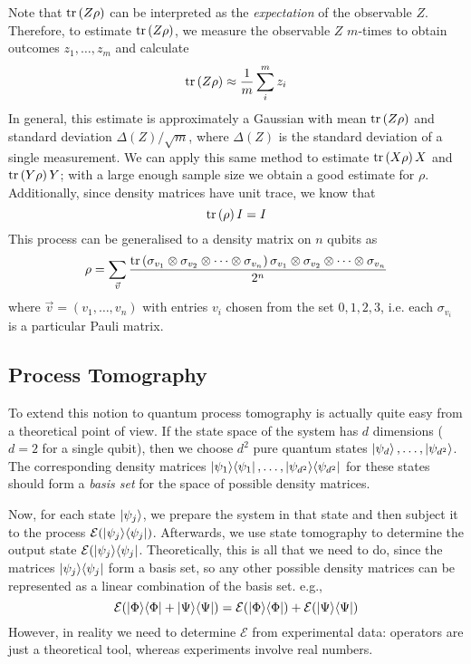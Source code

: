 Note that $\text{tr}\left(Z\rho\right)$ can be interpreted as the \textit{expectation} of the observable $Z$.
Therefore, to estimate $\text{tr}\left(Z\rho\right)$, we measure the observable $Z$ $m$-times to obtain outcomes
$z_1, \dots, z_m$ and calculate
\begin{equation}
    \text{tr}\left(Z\rho\right) \approx \frac{1}{m} \sum_i^m z_i
\end{equation}
In general, this estimate is approximately a Gaussian with mean $\text{tr}\left(Z\rho\right)$ and standard deviation
$\Delta(Z) / \sqrt{m}$, where $\Delta(Z)$ is the standard deviation of a single measurement. We can
apply this same method to estimate $\text{tr}\left(X\rho\right)X$ and $\text{tr}\left(Y\rho\right)Y$; with a large enough sample size
we obtain a good estimate for $\rho$. Additionally, since density matrices have unit trace, we know
that
\begin{equation}
    \text{tr}\left(\rho\right) I = I
\end{equation}
This process can be generalised to a density matrix on $n$ qubits as
\begin{equation}
    \rho = \sum_{\vec{v}} \frac{\text{tr}\left(\sigma_{v_1} \otimes \sigma_{v_2} \otimes \dots \otimes \sigma_{v_n}\right) \sigma_{v_1} \otimes \sigma_{v_2} \otimes \dots \otimes \sigma_{v_n}}{2^n}
\end{equation}
where $\vec{v} = \left(v_1, \dots, v_n\right)$ with entries $v_i$ chosen from the set $0, 1, 2, 3$,
i.e. each $\sigma_{v_i}$ is a particular Pauli matrix.


\subsection{Process Tomography}

To extend this notion to quantum process tomography is actually quite easy from a theoretical point
of view. If the state space of the system has $d$ dimensions ($d = 2$ for a single qubit), then we
choose $d^2$ pure quantum states $\ket{\psi_d}, \dots, \ket{\psi_{d^2}}$. The corresponding density
matrices $\ket{\psi_1}\!\bra{\psi_1}, \dots, \ket{\psi_{d^2}}\!\bra{\psi_{d^2}}$ for these states should
form a \textit{basis set} for the space of possible density matrices. 

Now, for each state $\ket{\psi_j}$, we prepare the system in that state and then subject it to the
process $\mathcal{E}(\ket{\psi_j}\!\bra{\psi_j})$. Afterwards, we use state tomography to determine the
output state $\mathcal{E}(\ket{\psi_j}\!\bra{\psi_j}$. Theoretically, this is all that we need to do,
since the matrices $\ket{\psi_j}\!\bra{\psi_j}$ form a basis set, so any other possible density
matrices can be represented as a linear combination of the basis set. e.g.,
\begin{equation}
    \mathcal{E}(\ket{\Phi}\!\bra{\Phi} + \ket{\Psi}\!\bra{\Psi}) = 
    \mathcal{E}(\ket{\Phi}\!\bra{\Phi}) + \mathcal{E}(\ket{\Psi}\!\bra{\Psi})
\end{equation}
However, in reality we need to determine $\mathcal{E}$ from experimental data: operators are just a
theoretical tool, whereas experiments involve real numbers.
